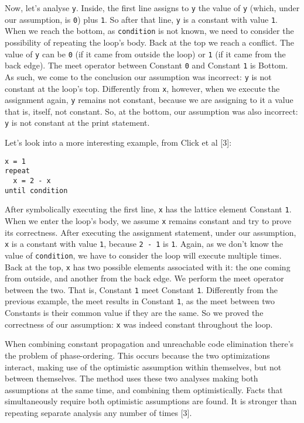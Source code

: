 \documentclass[
]{article}
\begin{document}
Now, let's analyse \texttt{y}. Inside, the first line assigns to
\texttt{y} the value of \texttt{y} (which, under our assumption, is
\texttt{0}) plus \texttt{1}. So after that line, \texttt{y} is a
constant with value \texttt{1}. When we reach the bottom, as
\texttt{condition} is not known, we need to consider the possibility of
repeating the loop's body. Back at the top we reach a conflict. The
value of \texttt{y} can be \texttt{0} (if it came from outside the loop)
or \texttt{1} (if it came from the back edge). The meet operator between
Constant \texttt{0} and Constant \texttt{1} is Bottom. As such, we come
to the conclusion our assumption was incorrect: \texttt{y} is not
constant at the loop's top. Differently from \texttt{x}, however, when
we execute the assignment again, \texttt{y} remains not constant,
because we are assigning to it a value that is, itself, not constant.
So, at the bottom, our assumption was also incorrect: \texttt{y} is not
constant at the print statement.

Let's look into a more interesting example, from Click et al {[}3{]}:

\begin{verbatim}
x = 1
repeat
  x = 2 - x
until condition
\end{verbatim}

After symbolically executing the first line, \texttt{x} has the lattice
element Constant \texttt{1}. When we enter the loop's body, we assume
\texttt{x} remains constant and try to prove its correctness. After
executing the assignment statement, under our assumption, \texttt{x} is
a constant with value \texttt{1}, because \texttt{2\ -\ 1} is
\texttt{1}. Again, as we don't know the value of \texttt{condition}, we
have to consider the loop will execute multiple times. Back at the top,
\texttt{x} has two possible elements associated with it: the one coming
from outside, and another from the back edge. We perform the meet
operator between the two. That is, Constant \texttt{1} meet Constant
\texttt{1}. Differently from the previous example, the meet results in
Constant \texttt{1}, as the meet between two Constants is their common
value if they are the same. So we proved the correctness of our
assumption: \texttt{x} was indeed constant throughout the loop.

When combining constant propagation and unreachable code elimination
there's the problem of phase-ordering. This occurs because the two
optimizations interact, making use of the optimistic assumption within
themselves, but not between themselves. The method uses these two
analyses making both assumptions at the same time, and combining them
optimistically. Facts that simultaneously require both optimistic
assumptions are found. It is stronger than repeating separate analysis
any number of times {[}3{]}.
\end{document}

